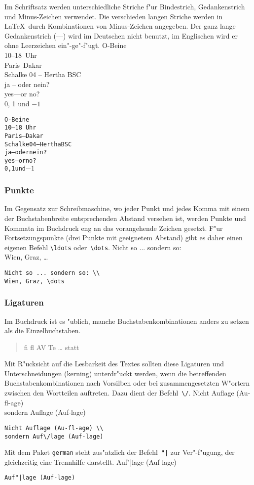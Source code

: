 Im Schriftsatz werden unterschiedliche Striche f"ur Bindestrich,
Gedankenstrich und Minus-Zeichen verwendet.
Die verschieden langen Striche werden in \LaTeX\ durch
Kombinationen von Minus-Zeichen angegeben. Der ganz lange
Gedankenstrich (\mbox{---}) wird im Deutschen nicht benutzt, im
Englischen wird er ohne Leerzeichen ein"-ge"-f"ugt.
\exa
O-Beine \\
10--18~Uhr \\
Paris--Dakar \\
Schalke 04 -- Hertha BSC \\
ja -- oder nein? \\
yes---or no? \\
0, 1 und $-1$
\exb
\begin{alltt}
O-Beine
10--18~Uhr
Paris--Dakar
Schalke 04 -- Hertha BSC
ja -- oder nein?
yes---or no?
0, 1 und $-1$
\end{alltt}
\exc
 
\subsubsection{Punkte}
 
Im Gegensatz zur Schreibmaschine, wo jeder Punkt und jedes Komma
mit einem der Buchstabenbreite entsprechenden Abstand versehen
ist, werden Punkte und Kommata im Buchdruck eng an das
vorangehende Zeichen gesetzt. F"ur Fortsetzungspunkte (drei
Punkte mit geeignetem Abstand) gibt es daher einen eigenen Befehl
\verb|\ldots| oder~\verb|\dots|.
\exa
Nicht so ... sondern so: \\
Wien, Graz, \dots
\exb
\begin{verbatim}
Nicht so ... sondern so: \\
Wien, Graz, \dots
\end{verbatim}
\exc
 
\subsubsection{Ligaturen}
 
Im Buchdruck ist es "ublich, manche Buchstabenkombinationen
anders zu setzen als die Einzelbuchstaben.
\begin{verse}
{\large fi fl AV Te \dots}\quad
statt
\end{verse}
Mit R"ucksicht auf die Lesbarkeit des Textes sollten
diese  Ligaturen und Unterschneidungen (kerning) 
unterdr"uckt werden, wenn die betreffenden Buchstabenkombinationen 
nach Vorsilben oder bei zusammengesetzten W"ortern zwischen den
Wortteilen auftreten.  Dazu dient der Befehl~\verb|\/|.
\exa
Nicht Auflage (Au-fl-age) \\
sondern Auf\/lage (Auf-lage)
\exb
\begin{verbatim}
Nicht Auflage (Au-fl-age) \\
sondern Auf\/lage (Auf-lage)
\end{verbatim}
\exc
Mit dem Paket \texttt{german} steht zus"atzlich der
Befehl~\verb:"|: zur Ver"-f"ugung, der gleichzeitig eine
Trennhilfe darstellt.
\exa
Auf"|lage (Auf-lage)
\exb
\begin{verbatim}
Auf"|lage (Auf-lage)
\end{verbatim}
\exc


